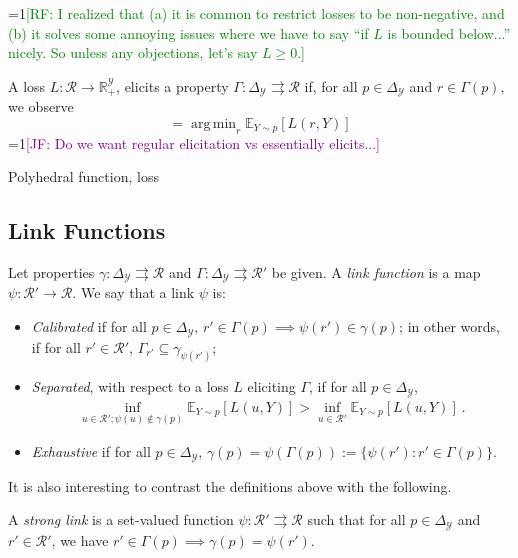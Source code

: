 \documentclass[anon,12pt]{colt2019}
\newcommand{\Comments}{1}
\newcommand{\mynote}[2]{\ifnum\Comments=1\textcolor{#1}{#2}\fi}
\newcommand{\raf}[1]{\mynote{green}{[RF: #1]}}
\newcommand{\jessie}[1]{\mynote{purple}{[JF: #1]}}
\newcommand{\reals}{\mathbb{R}}
\newcommand{\simplex}{\Delta_\Y}
\newcommand{\E}{\mathbb{E}}
\newcommand{\R}{\mathcal{R}}
\newcommand{\Y}{\mathcal{Y}}
\newcommand{\toto}{\rightrightarrows}
\DeclareMathOperator*{\argmin}{arg\,min}
\begin{document}
\begin{definition}
  \raf{I realized that (a) it is common to restrict losses to be non-negative, and (b) it solves some annoying issues where we have to say ``if $L$ is bounded below...'' nicely.  So unless any objections, let's say $L \geq 0$.}

  A loss $L:\R\to\reals^\Y_+$, elicits a property $\Gamma:\simplex \toto \R$ if, for all $p \in \simplex$ and $r \in \Gamma(p)$, we observe
  \begin{equation}
   = \argmin_r \E_{Y\sim p}[L(r,Y)]
  \end{equation}
  \jessie{Do we want regular elicitation vs essentially elicits...}
\end{definition}

\begin{definition}
  Polyhedral function, loss
\end{definition}

\subsection{Link Functions}

\begin{definition}
  Let properties $\gamma:\simplex\toto\R$ and $\Gamma:\simplex\toto\R'$ be given.
  A \emph{link function} is a map $\psi:\R'\to\R$.
  We say that a link $\psi$ is:
  \begin{itemize}
  \item \emph{Calibrated} if for all $p\in\simplex$, $r'\in \Gamma(p) \implies \psi(r') \in \gamma(p)$; in other words, if for all $r'\in\R'$, $\Gamma_{r'} \subseteq \gamma_{\psi(r')}$;
  \item \emph{Separated}, with respect to a loss $L$ eliciting $\Gamma$, if for all $p \in \simplex$,
  \begin{align*}
  \inf_{u \in \R'; \psi(u) \not \in \gamma(p)} \E_{Y\sim p}[L(u, Y)] > \inf_{u \in \R'}\E_{Y\sim p}[L(u, Y)]~.
  \end{align*}
  \item \emph{Exhaustive} if for all $p\in\simplex$, $\gamma(p) = \psi(\Gamma(p)) := \{\psi(r') : r'\in\Gamma(p)\}$.
  \end{itemize}
\end{definition}

It is also interesting to contrast the definitions above with the following.
\begin{definition}
  A \emph{strong link} is a set-valued function $\psi:\R'\toto\R$ such that for all $p\in\simplex$ and $r'\in\R'$, we have $r'\in\Gamma(p) \implies \gamma(p) = \psi(r')$.
\end{definition}
\end{document}
